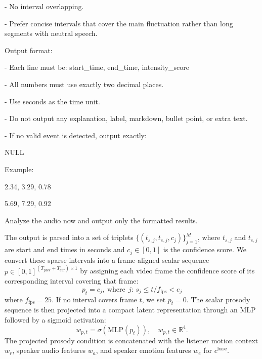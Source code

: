 \begin{tcolorbox}[
    enhanced, 
    breakable, 
    colback=gray!10!white, 
    colframe=gray!40!black, 
    fontupper=\fontsize{8pt}{9pt}\selectfont\ttfamily,
    sharp corners, 
    boxrule=0.5pt, 
    arc=0pt,
]
- No interval overlapping.

- Prefer concise intervals that cover the main fluctuation rather than long segments with neutral speech.
\vspace{1em}

Output format:

- Each line must be: start\_time, end\_time, intensity\_score

- All numbers must use exactly two decimal places.

- Use seconds as the time unit.

- Do not output any explanation, label, markdown, bullet point, or extra text.

- If no valid event is detected, output exactly:

NULL
\vspace{1em}

Example:

2.34, 3.29, 0.78

5.69, 7.29, 0.92

\vspace{1em}

Analyze the audio now and output only the formatted results.

\end{tcolorbox}

The output is parsed into a set of triplets $\{(t_{s,j},t_{e,j},c_j)\}_{j=1}^{M}$, where $t_{s,j}$ and $t_{e,j}$ are start and end times in seconds and $c_j\in[0,1]$ is the confidence score. We convert these sparse intervals into a frame-aligned scalar sequence $p\in[0,1]^{(T_{\mathrm{prev}}+T_{\mathrm{cur}})\times1}$ by assigning each video frame the confidence score of its corresponding interval covering that frame:
\begin{equation}
    p_t = c_j,\ \text{where}\ \ j:\,s_j \leq t/f_{\mathrm{fps}} < e_j
\end{equation}
where $f_{\mathrm{fps}}=25$. If no interval covers frame $t$, we set $p_t=0$. The scalar prosody sequence is then projected into a compact latent representation through an MLP followed by a sigmoid activation:
\begin{equation}
    w_{p,t} = \sigma\left(\mathrm{MLP}(p_t)\right), \quad w_{p,t}\in\mathbb{R}^{4}.
\end{equation}
The projected prosody condition is concatenated with the listener motion context $w_r$, speaker audio features $w_a$, and speaker emotion features $w_e$ for $c^{\text{base}}$.